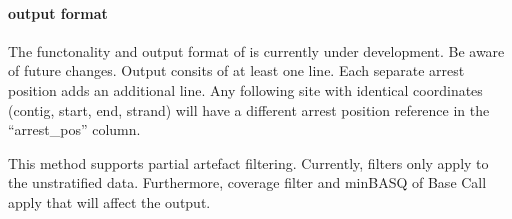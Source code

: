 \documentclass[10pt,a4paper,final]{article}
\begin{document}
\paragraph{\lrtarrest output format}\label{sec:lrt_arrest}
The functonality and output format of \lrtarrest is currently under development. Be aware of future changes. 
Output consits of at least one line. Each separate arrest position adds an additional line. 
Any following site with identical coordinates (contig, start, end, strand) will have a different 
arrest position reference in the ``arrest\_pos'' column. 

This method supports partial artefact filtering. Currently, filters only apply to the unstratified data. 
Furthermore, coverage filter and minBASQ of Base Call apply that will affect the output.
\end{document}
